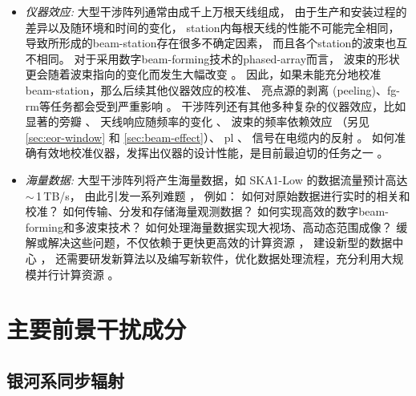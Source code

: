 \begin{itemize}
\item
\emph{仪器效应:}
大型干涉阵列通常由成千上万根天线组成，
由于生产和安装过程的差异以及随环境和时间的变化，
\ac{station}内每根天线的性能不可能完全相同，
导致所形成的\ac{beam-station}存在很多不确定因素，
而且各个\ac{station}的波束也互不相同。
对于采用数字\ac{beam-forming}技术的\ac{phased-array}而言，
波束的形状更会随着波束指向的变化而发生大幅改变
\cite{smirnov2011iii,vanWeeren2016,jagannathan2017}。
因此，如果未能充分地校准\ac{beam-station}，那么后续其他仪器效应的校准、
亮点源的剥离 (peeling)、\ac{fg-rm}等任务都会受到严重影响
\cite{noordam2004,neben2016}。
干涉阵列还有其他多种复杂的仪器效应，比如
显著的旁瓣 \cite{thyagarajan2015,mort2017}、
天线响应随频率的变化 \cite{bernardi2015,trott2017}、
波束的频率依赖效应 \cite{liu2009ps,datta2010,morales2012}
（另见 \autoref{sec:eor-window} 和 \autoref{sec:beam-effect}）、
\ac{pl} \cite{asad2015,asad2016,asad2018,lenc2017}、
信号在电缆内的反射 \cite{beardsley2016}。
如何准确有效地校准仪器，发挥出仪器的设计性能，是目前最迫切的任务之一
\cite{noordam2004,mitchell2008,wijnholds2010,barry2016,dillon2016}。

\item
\emph{海量数据:}
大型干涉阵列将产生海量数据，如 SKA1-Low 的数据流量预计高达 $\sim$\,1\,TB/s，
由此引发一系列难题 \cite{norris2011,dolensky2016,chrysostomou2018}，
例如：
如何对原始数据进行实时的相关和校准？
如何传输、分发和存储海量观测数据？
如何实现高效的数字\ac{beam-forming}和多波束技术？
如何处理海量数据实现大视场、高动态范围成像？
缓解或解决这些问题，不仅依赖于更快更高效的计算资源 \cite{magro2014,vermij2017}，
建设新型的数据中心 \cite{chrysostomou2018}，
还需要研发新算法以及编写新软件，优化数据处理流程，充分利用大规模并行计算资源
\cite{morales2009,bonaldi2018,farnes2018,gunst2018}。

\end{itemize}


\section{主要前景干扰成分}
\label{sec:fg-intro}

\subsection{银河系同步辐射}

